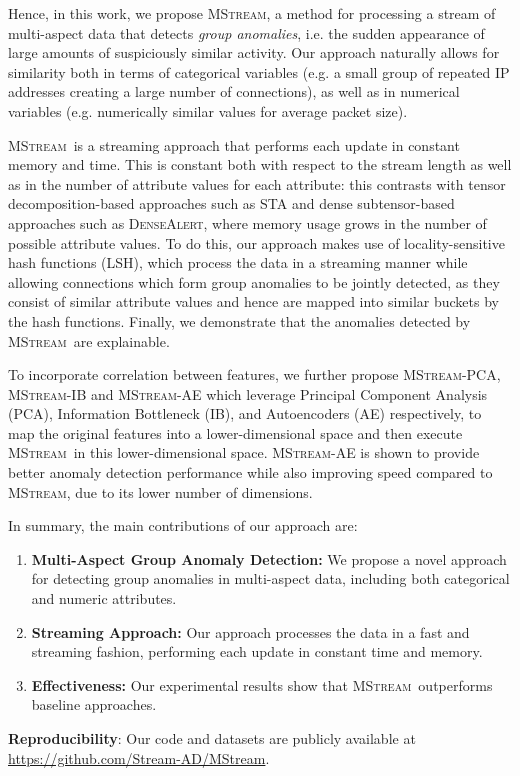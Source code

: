 \documentclass[sigconf]{acmart}
\newcommand{\method}{\textsc{MStream}}
\newcommand{\densealert}{\textsc{DenseAlert}}
\begin{document}
Hence, in this work, we propose \method, a method for processing a stream of multi-aspect data that detects \emph{group anomalies}, i.e. the sudden appearance of large amounts of suspiciously similar activity. Our approach naturally allows for similarity both in terms of categorical variables (e.g. a small group of repeated IP addresses creating a large number of connections), as well as in numerical variables (e.g. numerically similar values for average packet size).

\method\ is a streaming approach that performs each update in constant memory and time. This is constant both with respect to the stream length as well as in the number of attribute values for each attribute: this contrasts with tensor decomposition-based approaches such as STA and dense subtensor-based approaches such as \densealert, where memory usage grows in the number of possible attribute values. To do this, our approach makes use of locality-sensitive hash functions (LSH), which process the data in a streaming manner while allowing connections which form group anomalies to be jointly detected, as they consist of similar attribute values and hence are mapped into similar buckets by the hash functions. Finally, we demonstrate that the anomalies detected by \method\ are explainable.

To incorporate correlation between features, we further propose \method-PCA, \method-IB and \method-AE which leverage Principal Component Analysis (PCA), Information Bottleneck (IB), and Autoencoders (AE) respectively, to map the original features into a lower-dimensional space and then execute \method\ in this lower-dimensional space. \method-AE is shown to provide better anomaly detection performance while also improving speed compared to \method, due to its lower number of dimensions.

In summary, the main contributions of our approach are:
\begin{enumerate}
    \item {\bf Multi-Aspect Group Anomaly Detection:} We propose a novel approach for detecting group anomalies in multi-aspect data, including both categorical and numeric attributes.
    \item {\bf Streaming Approach:} Our approach processes the data in a fast and streaming fashion, performing each update in constant time and memory.
    \item {\bf Effectiveness:} Our experimental results show that \method\ outperforms baseline approaches.
\end{enumerate}
{\bf Reproducibility}: Our code and datasets are publicly available at \href{https://github.com/Stream-AD/MStream}{https://github.com/Stream-AD/MStream}.
\end{document}
